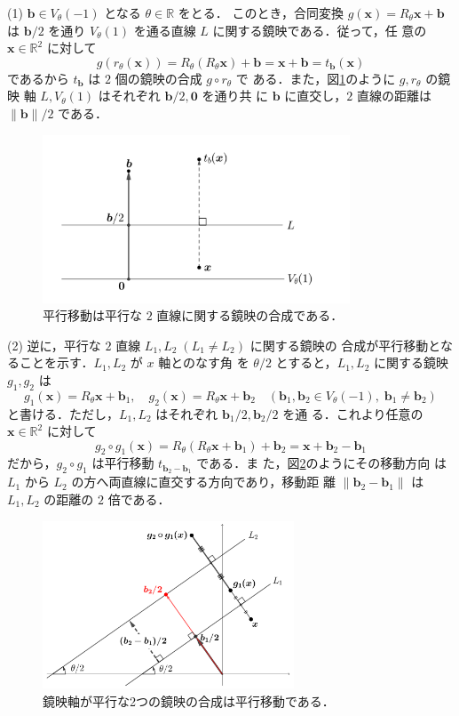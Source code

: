 \documentclass[11pt, uplatex, dvipdfmx, titlepage]{jsarticle}
\makeatletter
\renewenvironment{proof}[1][\proofname]{\par
  \pushQED{\qed}%
  \normalfont \topsep6\p@\@plus6\p@\relax
  \trivlist
  \item[\hskip\labelsep
         \bfseries
    {#1}]\ignorespaces
}{%
  \popQED\endtrivlist\@endpefalse
}
\theoremstyle{definition}
\renewcommand{\proofname}{\textbf{証明}}
\makeatother
\begin{document}
\begin{proof}
  (1) $\bm{b} \in V_{\theta}(-1)$ となる $\theta \in \mathbb{R}$ をとる．
  このとき，合同変換 $g(\bm{x})=R_{\theta}\bm{x}+\bm{b}$ は $\bm{b}/2$
  を通り $V_{\theta}(1)$ を通る直線 $L$ に関する鏡映である．従って，任
  意の $\bm{x} \in \mathbb{R}^2$ に対して
  \[
    g\left(r_{\theta}(\bm{x})\right) =
    R_{\theta}\left(R_{\theta}\bm{x}\right)+\bm{b} =
    \bm{x}+\bm{b}=t_{\bm{b}}(\bm{x})
  \]
  であるから $t_{\bm{b}}$ は $2$ 個の鏡映の合成 $g \circ r_{\theta}$ で
  ある．また，図\ref{fig:translation2}のように $g, r_{\theta}$ の鏡映
  軸 $L, V_{\theta}(1)$ はそれぞれ $\bm{b}/2, \bm{0}$ を通り共
  に $\bm{b}$ に直交し，$2$ 直線の距離は $\|\bm{b}\|/2$ である．
  \begin{figure}[h]
    \centering
    \includegraphics[height=5cm]{pictures/translation2.pdf}
    \caption{平行移動は平行な $2$ 直線に関する鏡映の合成である．}
    \label{fig:translation2}
  \end{figure}

  \noindent
  (2) 逆に，平行な $2$ 直線 $L_1, L_2 \; (L_1 \neq L_2)$ に関する鏡映の
  合成が平行移動となることを示す．$L_1, L_2$ が $x$ 軸とのなす角
  を $\theta/2$ とすると，$L_1, L_2$ に関する鏡映 $g_1, g_2$ は
  \[
    g_1(\bm{x}) = R_{\theta} \bm{x} + \bm{b}_1, \quad  g_2(\bm{x}) =R_{\theta}\bm{x} + \bm{b}_2 
    \quad \left( \bm{b}_1, \bm{b}_2 \in V_{\theta}(-1), \; \bm{b}_1 \neq \bm{b}_2\right)
  \]
  と書ける．ただし，$L_1, L_2$ はそれぞれ $\bm{b}_1/2, \bm{b}_2/2$ を通
  る．これより任意の $\bm{x} \in \mathbb{R}^2$ に対して
  \[
    g_2 \circ g_1 (\bm{x}) = R_{\theta}\left(R_{\theta}\bm{x} + \bm{b}_1\right)+\bm{b}_2
    = \bm{x} + \bm{b}_2 - \bm{b}_1
  \]
  だから，$g_2 \circ g_1$ は平行移動 $t_{\bm{b}_2-\bm{b}_1}$ である．ま
  た，図\ref{fig:translation2gen}のようにその移動方向
  は $L_1$ から $L_2$ の方へ両直線に直交する方向であり，移動距
  離 $\|\bm{b}_2-\bm{b}_1\|$ は $L_1, L_2$ の距離の $2$ 倍である．
  \begin{figure}[h]
    \centering
    \includegraphics[height=5cm]{pictures/translation2gen.pdf}
    \caption{鏡映軸が平行な2つの鏡映の合成は平行移動である．}
    \label{fig:translation2gen}
  \end{figure}
\end{proof}
\end{document}
